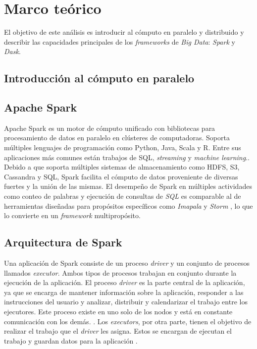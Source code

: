 \chapter{Marco teórico}

\noindent El objetivo de este análisis es introducir al cómputo en paralelo y distribuido y describir las capacidades principales de los \textit{frameworks}  de \textit{Big Data}: \textit{Spark} y \textit{Dask}.

\newpage

\section{Introducción al cómputo en paralelo}

\section{Apache Spark}

Apache Spark es un motor de cómputo unificado con bibliotecas para procesamiento de datos en paralelo en clústeres de computadoras. Soporta múltiples lenguajes de programación como Python, Java, Scala y R. Entre sus aplicaciones más comunes están trabajos de SQL, \textit{streaming} y \textit{machine learning}.\cite{sparkguide}. Debido a que soporta múltiples sistemas de almacenamiento como HDFS, S3, Cassandra y SQL, Spark facilita el cómputo de datos proveniente de diversas fuertes y la unión de las mismas. El desempeño de Spark en múltiples actividades como conteo de palabras y ejecución de consultas de \textit{SQL} es comparable al de herramientas diseñadas para propósitos específicos como \textit{Imapala} y \textit{Storm} \cite{sparkberkeley}, lo que lo convierte en un \textit{framework} multipropósito.

\section{Arquitectura de Spark}

Una aplicación de Spark consiste de un proceso \textit{driver} y un conjunto de procesos llamados \textit{executor}. Ambos tipos de procesos trabajan en conjunto durante la ejecución de la aplicación. El proceso \textit{driver} es la parte central de la aplicación, ya que se encarga de mantener información sobre la aplicación, responder a las instrucciones del usuario y analizar, distribuir y calendarizar el trabajo entre los ejecutores. Este proceso existe en uno solo de los nodos y está en constante comunicación con los demás. \cite{sparkguide}. Los \textit{executors}, por otra parte, tienen el objetivo de realizar el trabajo que el \textit{driver} les asigna. Estos se encargan de ejecutan el trabajo y guardan datos para la aplicación \cite{sparkclusteroverview}.

